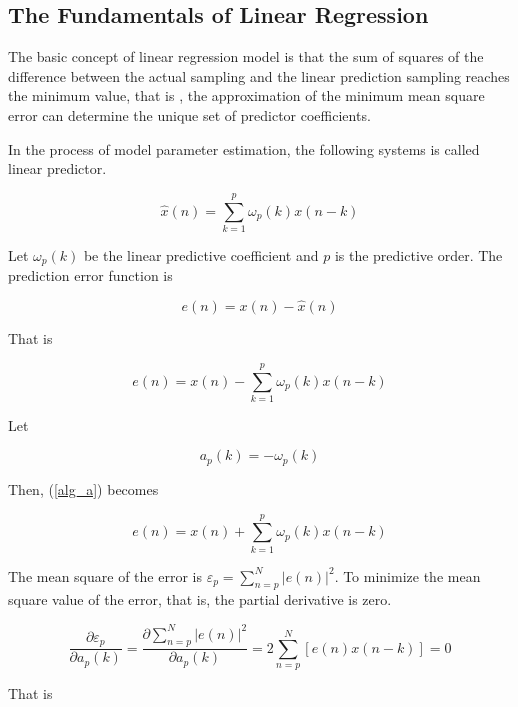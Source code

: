 \documentclass{mcmthesis}
\begin{document}
\subsection{The Fundamentals of Linear Regression}

The basic concept of linear regression model is that the sum of squares of the difference between the actual sampling and the linear prediction sampling reaches the minimum value, that is , the approximation of the minimum mean square error can determine the unique set of predictor coefficients.\cite{cao2009linear}

In the process of model parameter estimation, the following systems is called linear predictor.

\begin{equation}
  \hat{x}(n)=\sum_{k=1}^{p} \omega_{p}(k) x(n-k)
\end{equation}

Let $\omega_{p}(k)$ be the linear predictive coefficient and $p$ is the predictive order. The prediction error function is

\begin{equation}
  e(n)=x(n)-\hat{x}(n)
\end{equation}

That is

\begin{equation}
  e(n)=x(n)-\sum_{k=1}^{p} \omega_{p}(k) x(n-k)
  \label{alg_a}
\end{equation}

Let

\begin{equation}
  a_{p}(k)=-\omega_{p}(k)
\end{equation}

Then, (\ref{alg_a}) becomes

\begin{equation}
  e(n)=x(n)+\sum_{k=1}^{p} \omega_{p}(k) x(n-k)
  \label{alg_b}
\end{equation}

The mean square of the error is $\varepsilon_{p}=\sum_{n=p}^{N}|e(n)|^{2}$. To minimize the mean square value of the error, that is, the partial derivative is zero.

\begin{equation}
  \frac{\partial \varepsilon_{p}}{\partial a_{p}(k)}=\frac{\partial \sum_{n=p}^{N}|e(n)|^{2}}{\partial a_{p}(k)}=2 \sum_{n=p}^{N}[e(n) x(n-k)]=0
  \label{alg_c}
\end{equation}

That is
\end{document}

